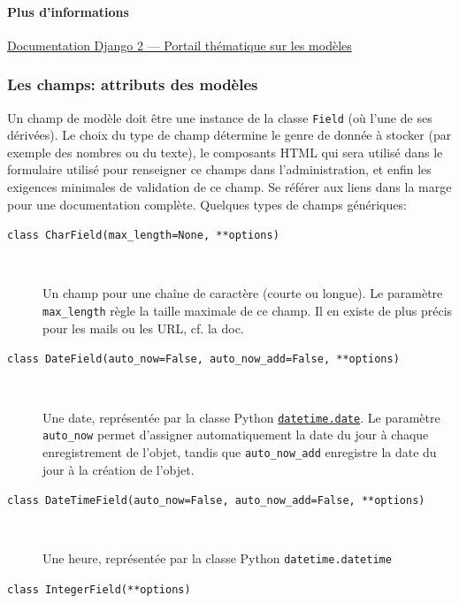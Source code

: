 \documentclass[a4paper, 10pt]{article}
\begin{document}
{\paragraph{Plus d'informations} \href{https://docs.djangoproject.com/fr/2.0/topics/db/}{Documentation Django 2 --- Portail thématique sur les modèles}

\subsubsection{Les champs: attributs des modèles}

Un champ  de modèle doit être une instance de la classe \texttt{Field} (où l'une de ses dérivées). Le choix du type de champ détermine le genre de donnée à stocker (par exemple des nombres ou du texte), le composants HTML qui sera utilisé dans le formulaire utilisé pour renseigner ce champs dans l'administration, et enfin les exigences minimales de validation de ce champ. Se référer aux liens dans la marge pour une documentation complète. Quelques types de champs génériques:
\begin{description}
	\item[\texttt{class CharField(max_length=None, **options)}]~

	      Un champ pour une chaîne de caractère (courte ou longue). Le paramètre \texttt{max\_length} règle la taille maximale de ce champ. Il en existe de plus précis pour les mails ou les URL, cf. la doc.

	\item[\texttt{class DateField(auto_now=False, auto_now_add=False, **options)}]~

	      Une date, représentée par la classe Python \hyperref[datetime]{\texttt{datetime.date}}. Le paramètre \texttt{auto\_now} permet d'assigner automatiquement la date du jour à chaque enregistrement de l'objet, tandis que \texttt{auto\_now\_add} enregistre la date du jour à la création de l'objet.

	\item[\texttt{class DateTimeField(auto_now=False, auto_now_add=False, **options)}]~

	      Une heure, représentée par la classe Python \texttt{datetime.datetime}

	\item[\texttt{class IntegerField(**options)}]~


\end{description}}
\end{document}
